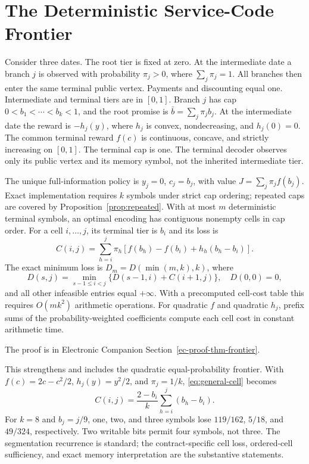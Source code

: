 \section{The Deterministic Service-Code Frontier}
Consider three dates. The root tier is fixed at zero. At the intermediate date a branch $j$ is observed with probability $\pi_j>0$, where $\sum_j\pi_j=1$. All branches then enter the same terminal public vertex. Payments and discounting equal one. Intermediate and terminal tiers are in $[0,1]$. Branch $j$ has cap $0<b_1<\cdots<b_k<1$, and the root promise is $\bar b=\sum_j\pi_jb_j$. At the intermediate date the reward is $-h_j(y)$, where $h_j$ is convex, nondecreasing, and $h_j(0)=0$. The common terminal reward $f(c)$ is continuous, concave, and strictly increasing on $[0,1]$. The terminal cap is one. The terminal decoder observes only its public vertex and its memory symbol, not the inherited intermediate tier.

\begin{theorem}\label{thm:frontier}
The unique full-information policy is $y_j=0$, $c_j=b_j$, with value $J=\sum_j\pi_j f(b_j)$. Exact implementation requires $k$ symbols under strict cap ordering; repeated caps are covered by Proposition~\ref{prop:repeated}. With at most $m$ deterministic terminal symbols, an optimal encoding has contiguous nonempty cells in cap order. For a cell $i,\ldots,j$, its terminal tier is $b_i$ and its loss is
\begin{equation}\label{eq:general-cell}
 C(i,j)=\sum_{h=i}^j\pi_h\left[f(b_h)-f(b_i)+h_h(b_h-b_i)\right].
\end{equation}
The exact minimum loss is $D_m=D(\min(m,k),k)$, where
\begin{equation}\label{eq:segmentation}
 D(s,j)=\min_{s-1\leq i<j}\{D(s-1,i)+C(i+1,j)\},\quad D(0,0)=0,
\end{equation}
and all other infeasible entries equal $+\infty$. With a precomputed cell-cost table this requires $O(mk^2)$ arithmetic operations. For quadratic $f$ and quadratic $h_j$, prefix sums of the probability-weighted coefficients compute each cell cost in constant arithmetic time.
\end{theorem}
\noindent The proof is in Electronic Companion Section~\ref{ec-proof-thm-frontier}.


This strengthens and includes the quadratic equal-probability frontier. With $f(c)=2c-c^2/2$, $h_j(y)=y^2/2$, and $\pi_j=1/k$, \eqref{eq:general-cell} becomes
\begin{equation}\label{eq:old-cell}
 C(i,j)=\frac{2-b_i}{k}\sum_{h=i}^j(b_h-b_i).
\end{equation}
For $k=8$ and $b_j=j/9$, one, two, and three symbols lose $119/162$, $5/18$, and $49/324$, respectively. Two writable bits permit four symbols, not three. The segmentation recurrence is standard; the contract-specific cell loss, ordered-cell sufficiency, and exact memory interpretation are the substantive statements.

